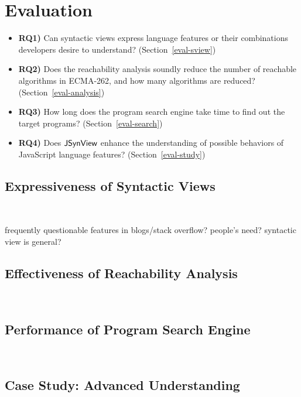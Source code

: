 \section{Evaluation}\label{sec:eval}

\begin{itemize}
  \item \textbf{RQ1)} Can syntactic views express language features or their
    combinations developers desire to understand? (Section~\ref{eval-sview})
  \item \textbf{RQ2)} Does the reachability analysis soundly reduce the number
    of reachable algorithms in ECMA-262, and how many algorithms are reduced?
    (Section~\ref{eval-analysis})
  \item \textbf{RQ3)} How long does the program search engine take time to find
    out the target programs? (Section~\ref{eval-search})
  \item \textbf{RQ4)} Does $\tool$ enhance the understanding of possible
    behaviors of JavaScript language features? (Section~\ref{eval-study})
\end{itemize}

\todo

\subsection{Expressiveness of Syntactic Views}~\label{eval-sview}

frequently questionable features in blogs/stack overflow?
people's need?
syntactic view is general?

\todo

\subsection{Effectiveness of Reachability Analysis}~\label{eval-analysis}

\todo

\subsection{Performance of Program Search Engine}~\label{eval-search}

\todo

\subsection{Case Study: Advanced Understanding}~\label{eval-study}

\todo
